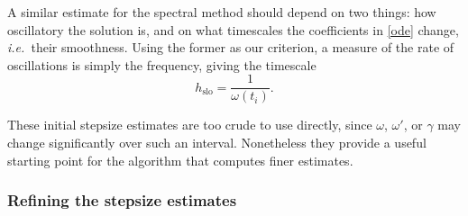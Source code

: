 \documentclass[10pt]{article}
\newcommand{\be}{\begin{equation}}
\newcommand{\ee}{\end{equation}}
\newcommand{\ie}{{\it i.e.\ }}
\newcommand{\eg}{{\it e.g.\ }}
\newcommand{\om}{\omega}
\newcommand{\g}{\gamma}
\begin{document}

A similar estimate for the spectral method should depend on two things: how
oscillatory the solution is, and on what timescales the coefficients in \cref{ode} change, \ie their smoothness. Using the former as our criterion,
a measure of the rate of
oscillations is simply the frequency, giving the timescale
\be\label{hsloini}
h_{\text{slo}} = \frac{1}{\om(t_i)}.
\ee

These initial stepsize estimates are too crude to use directly, since
$\om$, $\om'$, or $\g$ may change significantly over such an interval.
Nonetheless they provide a useful starting point for the algorithm that computes
finer estimates.


\subsubsection{Refining the stepsize estimates}

%
\end{document}
